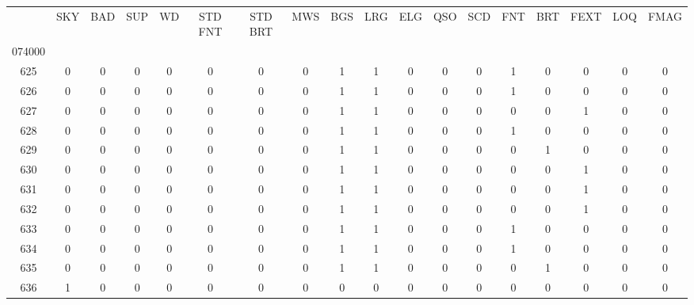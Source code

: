 \begin{tabular}{|c|c|c|c|c|c|c|c|c|c|c|c|c|c|c|c|c|c|}\toprule{} &  SKY &  BAD &  SUP &  WD &  STD FNT &  STD BRT &  MWS &  BGS &  LRG &  ELG &  QSO &  SCD &  FNT &  BRT &  FEXT &  LOQ &  FMAG \\074000 &      &      &      &     &          &          &      &      &      &      &      &      &      &      &       &      &       \\\midrule625    &    0 &    0 &    0 &   0 &        0 &        0 &    0 &    1 &    1 &    0 &    0 &    0 &    1 &    0 &     0 &    0 &     0 \\
\midrule
626    &    0 &    0 &    0 &   0 &        0 &        0 &    0 &    1 &    1 &    0 &    0 &    0 &    1 &    0 &     0 &    0 &     0 \\
\midrule
627    &    0 &    0 &    0 &   0 &        0 &        0 &    0 &    1 &    1 &    0 &    0 &    0 &    0 &    0 &     1 &    0 &     0 \\
\midrule
628    &    0 &    0 &    0 &   0 &        0 &        0 &    0 &    1 &    1 &    0 &    0 &    0 &    1 &    0 &     0 &    0 &     0 \\
\midrule
629    &    0 &    0 &    0 &   0 &        0 &        0 &    0 &    1 &    1 &    0 &    0 &    0 &    0 &    1 &     0 &    0 &     0 \\
\midrule
630    &    0 &    0 &    0 &   0 &        0 &        0 &    0 &    1 &    1 &    0 &    0 &    0 &    0 &    0 &     1 &    0 &     0 \\
\midrule
631    &    0 &    0 &    0 &   0 &        0 &        0 &    0 &    1 &    1 &    0 &    0 &    0 &    0 &    0 &     1 &    0 &     0 \\
\midrule
632    &    0 &    0 &    0 &   0 &        0 &        0 &    0 &    1 &    1 &    0 &    0 &    0 &    0 &    0 &     1 &    0 &     0 \\
\midrule
633    &    0 &    0 &    0 &   0 &        0 &        0 &    0 &    1 &    1 &    0 &    0 &    0 &    1 &    0 &     0 &    0 &     0 \\
\midrule
634    &    0 &    0 &    0 &   0 &        0 &        0 &    0 &    1 &    1 &    0 &    0 &    0 &    1 &    0 &     0 &    0 &     0 \\
\midrule
635    &    0 &    0 &    0 &   0 &        0 &        0 &    0 &    1 &    1 &    0 &    0 &    0 &    0 &    1 &     0 &    0 &     0 \\
\midrule
636    &    1 &    0 &    0 &   0 &        0 &        0 &    0 &    0 &    0 &    0 &    0 &    0 &    0 &    0 &     0 &    0 &     0 \\

\end{tabular}
